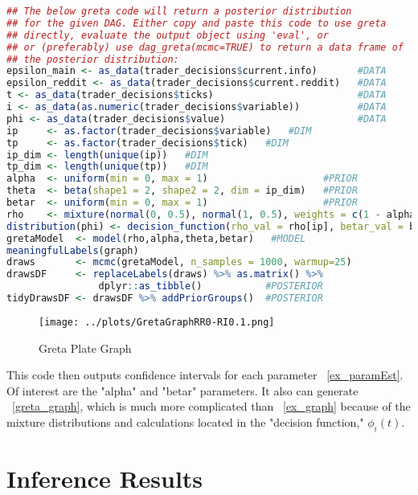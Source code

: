 \documentclass[a4paper, 11pt]{report}
\let\Oldsection\section
\renewcommand{\section}{\FloatBarrier\Oldsection}
\begin{document}
\begin{lstlisting}[language=R]
## The below greta code will return a posterior distribution 
## for the given DAG. Either copy and paste this code to use greta
## directly, evaluate the output object using 'eval', or 
## or (preferably) use dag_greta(mcmc=TRUE) to return a data frame of
## the posterior distribution: 
epsilon_main <- as_data(trader_decisions$current.info)       #DATA
epsilon_reddit <- as_data(trader_decisions$current.reddit)   #DATA
t <- as_data(trader_decisions$ticks)                         #DATA
i <- as_data(as.numeric(trader_decisions$variable))          #DATA
phi <- as_data(trader_decisions$value)                       #DATA
ip     <- as.factor(trader_decisions$variable)   #DIM
tp     <- as.factor(trader_decisions$tick)   #DIM
ip_dim <- length(unique(ip))   #DIM
tp_dim <- length(unique(tp))   #DIM
alpha  <- uniform(min = 0, max = 1)                    #PRIOR
theta  <- beta(shape1 = 2, shape2 = 2, dim = ip_dim)   #PRIOR
betar  <- uniform(min = 0, max = 1)                    #PRIOR
rho    <- mixture(normal(0, 0.5), normal(1, 0.5), weights = c(1 - alpha, alpha), dim = ip_dim)     #PRIOR
distribution(phi) <- decision_function(rho_val = rho[ip], betar_val = betar, er_val = epsilon_reddit[tp], em_val = epsilon_main[tp], theta_val = theta[ip])   #LIKELIHOOD
gretaModel  <- model(rho,alpha,theta,betar)   #MODEL
meaningfulLabels(graph)
draws       <- mcmc(gretaModel, n_samples = 1000, warmup=25)              #POSTERIOR
drawsDF     <- replaceLabels(draws) %>% as.matrix() %>%
                dplyr::as_tibble()           #POSTERIOR
tidyDrawsDF <- drawsDF %>% addPriorGroups()  #POSTERIOR
\end{lstlisting}

\begin{figure}[h!]
	\caption{Greta Plate Graph}
	\label{greta_graph}
	\texttt{[image: ../plots/GretaGraphRR0-RI0.1.png]}
\end{figure}

This code then outputs confidence intervals for each parameter ~\autoref{ex_paramEst}. Of interest are the "alpha" and "betar" parameters. It also can generate ~\autoref{greta_graph}, which is much more complicated than ~\autoref{ex_graph} because of the mixture distributions and calculations located in the "decision function," $\phi_{i}(t)$.

\section{Inference Results}
\end{document}
